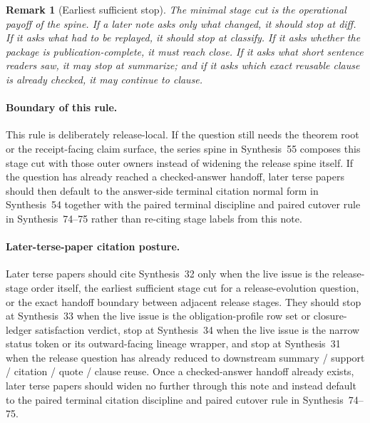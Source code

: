 \documentclass[11pt]{article}
\newtheorem{remark}{Remark}
\begin{document}
\begin{remark}[Earliest sufficient stop]
The minimal stage cut is the operational payoff of the spine. If a later note asks only what changed, it should stop at \textsf{diff}. If it asks what had to be replayed, it should stop at \textsf{classify}. If it asks whether the package is publication-complete, it must reach \textsf{close}. If it asks what short sentence readers saw, it may stop at \textsf{summarize}; and if it asks which exact reusable clause is already checked, it may continue to \textsf{clause}.
\end{remark}

\paragraph{Boundary of this rule.} This rule is deliberately release-local. If the question still needs the theorem root or the receipt-facing claim surface, the series spine in Synthesis~55 composes this stage cut with those outer owners instead of widening the release spine itself. If the question has already reached a checked-answer handoff, later terse papers should then default to the answer-side terminal citation normal form in Synthesis~54 together with the paired terminal discipline and paired cutover rule in Synthesis~74--75 rather than re-citing stage labels from this note.\cite{series:seriesspines,series:challengeanswerreviewmenus,series:pairedterminalcitationdiscipline,series:pairedterminalcutoverrules}

\paragraph{Later-terse-paper citation posture.} Later terse papers should cite Synthesis~32 only when the live issue is the release-stage order itself, the earliest sufficient stage cut for a release-evolution question, or the exact handoff boundary between adjacent release stages. They should stop at Synthesis~33 when the live issue is the obligation-profile row set or closure-ledger satisfaction verdict, stop at Synthesis~34 when the live issue is the narrow status token or its outward-facing lineage wrapper, and stop at Synthesis~31 when the release question has already reduced to downstream summary / support / citation / quote / clause reuse. Once a checked-answer handoff already exists, later terse papers should widen no further through this note and instead default to the paired terminal citation discipline and paired cutover rule in Synthesis~74--75.\cite{series:releaseclosure,series:statusenvelopes,series:downstreamnormalforms,series:pairedterminalcitationdiscipline,series:pairedterminalcutoverrules}
\end{document}
